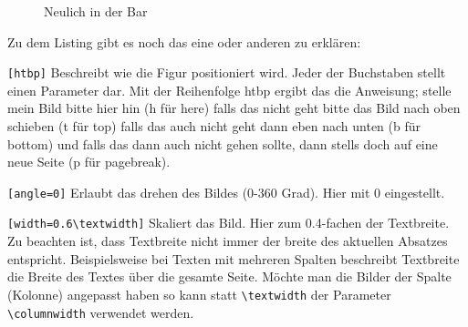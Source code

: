                   
\begin{figure}[htbp]
    \centering
{}
    \caption{Neulich in der Bar}
    \label{pic:inderbar}
\end{figure}


\noindent
Zu dem Listing gibt es noch das eine oder anderen zu
erklären:

\begin{description}
    \item \lstinline|[htbp]| Beschreibt wie die Figur
positioniert           wird.
           Jeder der Buchstaben stellt einen Parameter dar.
           Mit der Reihenfolge htbp ergibt das die
           Anweisung; stelle mein Bild bitte hier hin (h
           für here) falls das nicht geht bitte das Bild
           nach oben schieben (t für top) falls das auch
           nicht geht dann eben nach unten (b für bottom)
           und falls das dann auch nicht gehen sollte, dann
           stells doch auf eine neue Seite (p für
           pagebreak).
    \item \lstinline|[angle=0]| Erlaubt das drehen des
Bildes
           (0-360 Grad). Hier mit 0 eingestellt.
    \item \lstinline|[width=0.6\textwidth]| Skaliert das
Bild. Hier
            zum 0.4-fachen der Textbreite. Zu
            beachten ist, dass           Textbreite nicht
            immer der breite des aktuellen          
            Absatzes entspricht. Beispielsweise bei Texten  
            mit mehreren Spalten beschreibt Textbreite die  
            Breite des Textes über die gesamte Seite. Möchte
            man die Bilder der Spalte (Kolonne) angepasst   
            haben so kann statt \lstinline|\textwidth| der  
            Parameter \lstinline|\columnwidth| verwendet    
            werden.
\end{description}


